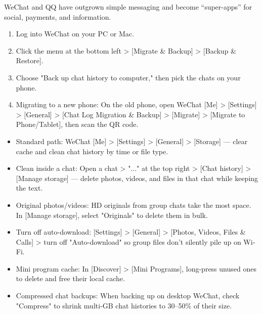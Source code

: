 WeChat and QQ have outgrown simple messaging and become “super-apps” for social, payments, and information.


\begin{enumerate}
  \item Log into WeChat on your PC or Mac.
  \item Click the menu at the bottom left > [Migrate \& Backup] > [Backup \& Restore].
  \item Choose "Back up chat history to computer," then pick the chats on your phone.
  \item Migrating to a new phone: On the old phone, open WeChat [Me] > [Settings] > [General] > [Chat Log Migration \& Backup] > [Migrate] > [Migrate to Phone/Tablet], then scan the QR code.
\end{enumerate}


\begin{itemize}
  \item Standard path: WeChat [Me] > [Settings] > [General] > [Storage] — clear cache and clean chat history by time or file type.
  \item Clean inside a chat: Open a chat > "..." at the top right > [Chat history] > [Manage storage] — delete photos, videos, and files in that chat while keeping the text.
  \item Original photos/videos: HD originals from group chats take the most space. In [Manage storage], select "Originals" to delete them in bulk.
  \item Turn off auto-download: [Settings] > [General] > [Photos, Videos, Files \& Calls] > turn off "Auto-download" so group files don't silently pile up on Wi-Fi.
  \item Mini program cache: In [Discover] > [Mini Programs], long-press unused ones to delete and free their local cache.
  \item Compressed chat backups: When backing up on desktop WeChat, check "Compress" to shrink multi-GB chat histories to 30–50\% of their size.
\end{itemize}


